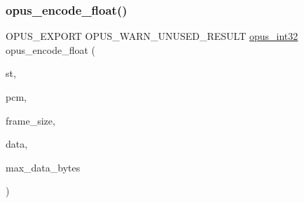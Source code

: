 \subsubsection{\texorpdfstring{opus\+\_\+encode\+\_\+float()}{opus\_encode\_float()}}
{\footnotesize\ttfamily O\+P\+U\+S\+\_\+\+E\+X\+P\+O\+RT O\+P\+U\+S\+\_\+\+W\+A\+R\+N\+\_\+\+U\+N\+U\+S\+E\+D\+\_\+\+R\+E\+S\+U\+LT \hyperlink{opus__types_8h_aa4d309d6f80b99dbabebc8f98879ab9a}{opus\+\_\+int32} opus\+\_\+encode\+\_\+float (\begin{DoxyParamCaption}\item[{\hyperlink{group__opus__encoder_gaf461a3ef2f10c2fe8b994a176f06c9bd}{Opus\+Encoder} $\ast$}]{st,  }\item[{\hyperlink{zconf_8h_a2c212835823e3c54a8ab6d95c652660e}{const} float $\ast$}]{pcm,  }\item[{int}]{frame\+\_\+size,  }\item[{unsigned char $\ast$}]{data,  }\item[{\hyperlink{opus__types_8h_aa4d309d6f80b99dbabebc8f98879ab9a}{opus\+\_\+int32}}]{max\+\_\+data\+\_\+bytes }\end{DoxyParamCaption})}

